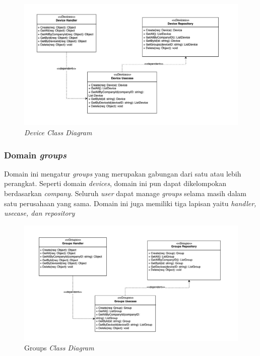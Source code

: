 \begin{figure}[ht]
  \centering
  \includegraphics[width=1\textwidth]{resources/chapter-3/class/device-class-diagram.jpg}
  \caption{\textit{Device Class Diagram}}
  \label{fig:device-class-diagram}
\end{figure}

\subsubsection{Domain \textit{groups}}

Domain ini mengatur \textit{groups} yang merupakan gabungan dari satu atau lebih perangkat. Seperti domain \textit{devices}, domain ini pun dapat dikelompokan berdasarkan \textit{company}. Seluruh \textit{user} dapat manage \textit{groups} selama masih dalam satu perusahaan yang sama. Domain ini juga memiliki tiga lapisan yaitu \textit{handler, usecase, dan repository}

\begin{figure}[ht]
  \centering
  \includegraphics[width=1\textwidth]{resources/chapter-3/class/groups-class-diagram.jpg}
  \caption{Groups \textit{Class Diagram}}
  \label{fig:groups-class-diagram}
\end{figure}

